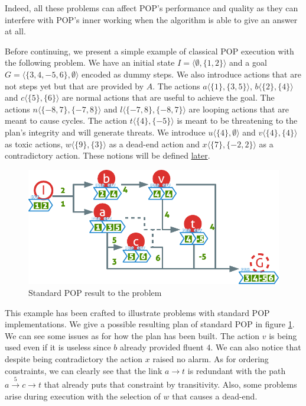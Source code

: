 \documentclass[]{article}
\begin{document}
Indeed, all these problems can affect POP's performance and quality as
they can interfere with POP's inner working when the algorithm is able
to give an answer at all.

Before continuing, we present a simple example of classical POP
execution with the following problem. We have an initial state
\(I = \langle \emptyset , \{ 1, 2 \} \rangle\) and a goal
\(G = \langle \{ 3, 4, -5, 6 \}, \emptyset \rangle\) encoded as dummy
steps. We also introduce actions that are not steps yet but that are
provided by \(A\). The actions \(a \langle \{1\}, \{3,5\} \rangle\),
\(b \langle \{2\}, \{4\} \rangle\) and
\(c \langle \{5\}, \{6\} \rangle\) are normal actions that are useful to
achieve the goal. The actions \(n \langle \{-8, 7\}, \{-7, 8\} \rangle\)
and \(l \langle \{-7, 8\}, \{-8, 7\} \rangle\) are looping actions that
are meant to cause cycles. The action
\(t \langle \{4\}, \{-5\} \rangle\) is meant to be threatening to the
plan's integrity and will generate threats. We introduce
\(u \langle \{4\}, \emptyset \rangle\) and
\(v \langle \{4\}, \{4\} \rangle\) as toxic actions,
\(w \langle \{9\}, \{3\} \rangle\) as a dead-end action and
\(x \langle \{7\}, \{-2,2\} \rangle\) as a contradictory action. These
notions will be defined \protect\hyperlink{defects}{later}.

\begin{figure}[htbp]
\centering
\includegraphics{graphics/pop.pdf}
\caption{Standard POP result to the problem\label{fig:pop}}
\end{figure}

This example has been crafted to illustrate problems with standard POP
implementations. We give a possible resulting plan of standard POP in
figure \ref{fig:pop}. We can see some issues as for how the plan has
been built. The action \(v\) is being used even if it is useless since
\(b\) already provided fluent \(4\). We can also notice that despite
being contradictory the action \(x\) raised no alarm. As for ordering
constraints, we can clearly see that the link \(a \to t\) is redundant
with the path \(a \xrightarrow{5} c \to t\) that already puts that
constraint by transitivity. Also, some problems arise during execution
with the selection of \(w\) that causes a dead-end.
\end{document}
